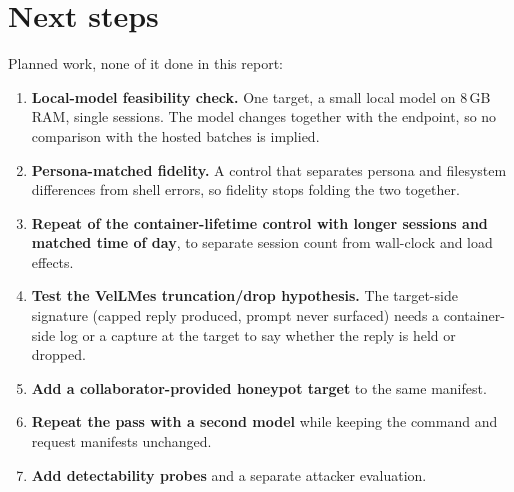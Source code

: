 \documentclass[a4paper,11pt]{article}
\begin{document}
\section{Next steps}

Planned work, none of it done in this report:
\begin{enumerate}[leftmargin=*]
\item \textbf{Local-model feasibility check.} One target, a small local model on
  8\,GB RAM, single sessions. The model changes together with the endpoint, so
  no comparison with the hosted batches is implied.
\item \textbf{Persona-matched fidelity.} A control that separates persona and
  filesystem differences from shell errors, so fidelity stops folding the two
  together.
\item \textbf{Repeat of the container-lifetime control with longer sessions and
  matched time of day}, to separate session count from wall-clock and load
  effects.
\item \textbf{Test the VelLMes truncation/drop hypothesis.} The target-side
  signature (capped reply produced, prompt never surfaced) needs a
  container-side log or a capture at the target to say whether the reply is
  held or dropped.
\item \textbf{Add a collaborator-provided honeypot target} to the same manifest.
\item \textbf{Repeat the pass with a second model} while keeping the command and
  request manifests unchanged.
\item \textbf{Add detectability probes} and a separate attacker evaluation.
\end{enumerate}
\end{document}
